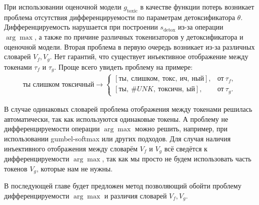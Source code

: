 При использовании оценочной модели $g_{\text{toxic}}$ в качестве функции потерь возникает проблема отсутствия дифференцируемости по параметрам детоксификатора $\theta$.
Дифференцируемость нарушается при построении $s_{\text{detox}}$ из-за операции $\arg\max$, а также по причине различных токенизаторов у детоксификатора и оценочной модели.
Вторая проблема в первую очередь возникает из-за различных словарей $V_{f}, V_{g}$.
Нет гарантий, что существует инъективное отображение между токенами $\tau_{f}$ и $\tau_{g}$. 
Проще всего увидеть проблему на примере: 
\begin{gather*}
    \textit{ты слишком токсичный} \longrightarrow 
    \begin{cases} 
        [\textit{ты},\ \textit{слишком},\ \textit{токс},\ \textit{ич},\ \textit{ный}], &\text{от}\ \tau_{f}, \\
        [\textit{ты},\ \textit{\#UNK},\ \textit{токсичн},\ \textit{ый}], &\text{от}\ \tau_{g}.
    \end{cases}
\end{gather*}

В случае одинаковых словарей проблема отображения между токенами решилась автоматически, так как используются одинаковые токены. 
А проблему не дифференцируемости операции $\arg\max$ можно решить, например, при использовании gumbel-softmax или других подходов. 
Для случая наличия инъективного отображения между словарём $V_{f}$ и $V_{g}$ всё сведётся к дифференцируемости $\arg\max$, так как мы просто не будем использовать часть токенов $V_{g}$, которые нам не нужны.

В последующей главе  будет предложен метод позволяющий обойти проблему дифференцируемости $\arg\max$ и различия словарей $V_{f}, V_{g}$. 
